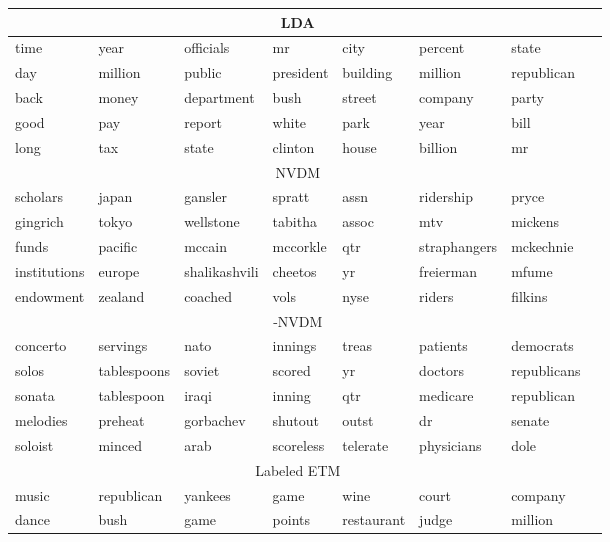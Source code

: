 \documentclass[11pt,a4paper]{article}
\begin{document}
\begin{table*}[t]
  \centering \small {}  \vskip 0.1in
 \begin{tabular}{llllllll}
 \toprule
\multicolumn{7}{c}{LDA}\\
 \hline
     time & year & officials & mr & city & percent & state  \\
     day & million & public & president & building & million & republican  \\
     back & money & department & bush & street  & company  & party  \\
     good & pay & report  & white & park & year  & bill \\
     long & tax & state  & clinton & house & billion  & mr  \\
     \midrule 
\multicolumn{7}{c}{\gls{NVDM}}\\
\hline
     scholars & japan & gansler & spratt & assn & ridership & pryce \\
     gingrich & tokyo & wellstone & tabitha & assoc & mtv & mickens  \\
     funds & pacific & mccain & mccorkle & qtr & straphangers & mckechnie   \\
     institutions & europe & shalikashvili & cheetos & yr & freierman & mfume \\
     endowment & zealand & coached & vols  & nyse  & riders & filkins \\
\midrule
\multicolumn{7}{c}{-\gls{NVDM}}\\
\hline
     concerto & servings & nato & innings & treas & patients & democrats  \\
     solos & tablespoons & soviet & scored & yr & doctors  & republicans \\
     sonata & tablespoon & iraqi & inning & qtr & medicare & republican \\
     melodies & preheat  &  gorbachev & shutout & outst  & dr & senate \\
     soloist & minced &  arab & scoreless & telerate & physicians & dole \\
\midrule
\multicolumn{7}{c}{Labeled \gls{ETM}}\\
\hline
     music & republican & yankees & game &  wine &  court & company  \\
     dance & bush & game & points & restaurant &  judge & million \\

\end{tabular}
\end{table*}
\end{document}
